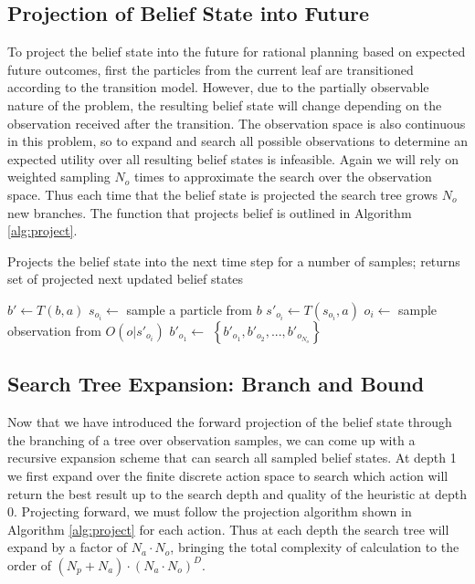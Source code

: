 \subsection{Projection of Belief State into Future \label{subsec:projection}}
	To project the belief state into the future for rational planning based on expected future outcomes, first the particles from the current leaf are transitioned according to the transition model.  However, due to the partially observable nature of the problem, the resulting belief state will change depending on the observation received after the transition.  The observation space is also continuous in this problem, so to expand and search all possible observations to determine an expected utility over all resulting belief states is infeasible.  Again we will rely on weighted sampling $N_o $ times to approximate the search over the observation space.  Thus each time that the belief state is projected the search tree grows $N_o$ new branches.  The function that projects belief is outlined in Algorithm \ref{alg:project}.
	\begin{algorithm}\caption{Projects the belief state into the next time step for a number of samples; returns set of projected next updated belief states}\label{alg:project}
	\begin{algorithmic}
			\State $b' \gets T\left(b, a\right)$
			\State $s_{o_i} \gets$ sample a particle from $b$
			\State $s'_{o_i} \gets T\left(s_{o_i}, a\right)$
			\State $o_i \gets$ sample observation from $O\left(o|s'_{o_i}\right)$
			\State $b'_{o_1}\gets$  
			\EndFor
			\State \Return $\left\{b'_{o_1}, b'_{o_2}, ..., b'_{o_{N_o}} \right\}$
		\EndFunction
	\end{algorithmic}
	\end{algorithm}

\subsection{Search Tree Expansion: Branch and Bound}
	Now that we have introduced the forward projection of the belief state through the branching of a tree over observation samples, we can come up with a recursive expansion scheme that can search all sampled belief states.  At depth 1 we first expand over the finite discrete action space to search which action will return the best result up to the search depth and quality of the heuristic at depth 0.  Projecting forward, we must follow the projection algorithm shown in Algorithm \ref{alg:project} for each action.  Thus at each depth the search tree will expand by a factor of $N_a \cdot N_o$, bringing the total complexity of calculation to the order of $(N_p+N_a)\cdot\left(N_a \cdot N_o\right)^D$.  
	
